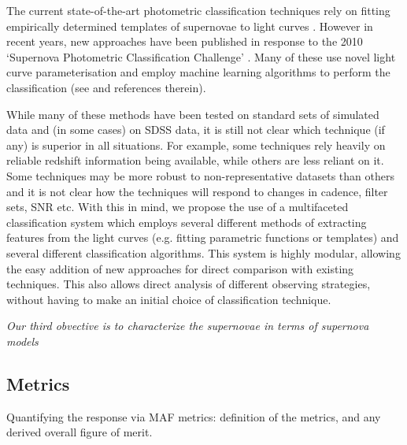The current state-of-the-art photometric classification techniques rely on fitting empirically 
determined templates of supernovae to light curves \citep{Jha2007,Guy2007,Sako2011}. However in 
recent years, new approaches have been published in response to the 2010 `Supernova 
Photometric Classification Challenge' \citep{Kessler2010a}. Many of these use novel light curve 
parameterisation and employ machine learning algorithms to perform the classification (see \citet{Kessler2010b} and references therein).

While many of these methods have been tested on standard sets of simulated data and (in some cases) 
on SDSS data, it is still not clear which technique (if any) is superior in all situations. For 
example, some techniques rely heavily on reliable redshift information being available, while others 
are less reliant on it. Some techniques may be more robust to non-representative datasets than 
others and it is not clear how the techniques will respond to changes in cadence, filter sets, SNR 
etc. With this in mind, we propose the use of a multifaceted classification system which employs 
several different methods of extracting features from the light curves (e.g. fitting parametric 
functions or templates) and several different classification algorithms. This system is highly 
modular, allowing the easy addition of new approaches for direct comparison with existing  techniques. This also allows direct analysis of different observing strategies, without having to 
make an initial choice of classification technique. 


{\emph{Our third obvective is to characterize the supernovae in terms of supernova models}}








\subsection{Metrics}
\label{sec:keyword:metrics}

Quantifying the response via MAF metrics: definition of the metrics,
and any derived overall figure of merit.


